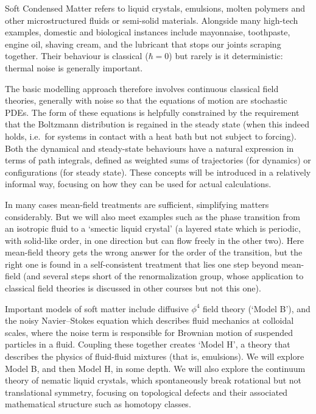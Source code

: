 \documentclass[a4paper]{article}
\begin{document}
\maketitle
{\small
\setlength{\parindent}{0em}
\setlength{\parskip}{1em}
Soft Condensed Matter refers to liquid crystals, emulsions, molten polymers and other microstructured fluids or semi-solid materials. Alongside many high-tech examples, domestic and biological instances include mayonnaise, toothpaste, engine oil, shaving cream, and the lubricant that stops our joints scraping together. Their behaviour is classical ($\hbar = 0$) but rarely is it deterministic: thermal noise is generally important.

The basic modelling approach therefore involves continuous classical field theories, generally with noise so that the equations of motion are stochastic PDEs. The form of these equations is helpfully constrained by the requirement that the Boltzmann distribution is regained in the steady state (when this indeed holds, i.e.\ for systems in contact with a heat bath but not subject to forcing). Both the dynamical and steady-state behaviours have a natural expression in terms of path integrals, defined as weighted sums of trajectories (for dynamics) or configurations (for steady state). These concepts will be introduced in a relatively informal way, focusing on how they can be used for actual calculations.

In many cases mean-field treatments are sufficient, simplifying matters considerably. But we will also meet examples such as the phase transition from an isotropic fluid to a `smectic liquid crystal' (a layered state which is periodic, with solid-like order, in one direction but can flow freely in the other two). Here mean-field theory gets the wrong answer for the order of the transition, but the right one is found in a self-consistent treatment that lies one step beyond mean-field (and several steps short of the renormalization group, whose application to classical field theories is discussed in other courses but not this one).

Important models of soft matter include diffusive $\phi^4$ field theory (`Model B'), and the noisy Navier--Stokes equation which describes fluid mechanics at colloidal scales, where the noise term is responsible for Brownian motion of suspended particles in a fluid. Coupling these together creates `Model H', a theory that describes the physics of fluid-fluid mixtures (that is, emulsions). We will explore Model B, and then Model H, in some depth. We will also explore the continuum theory of nematic liquid crystals, which spontaneously break rotational but not translational symmetry, focusing on topological defects and their associated mathematical structure such as homotopy classes.

}
\end{document}
